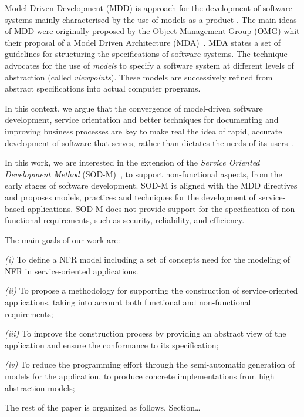 Model Driven Development (MDD) is approach for the development of software systems mainly characterised by the use of models as a product \cite{Selic03}.
The main ideas of MDD were originally proposed by the Object Management Group (OMG) whit their proposal of a Model Driven Architecture (MDA)~\cite{miller}. MDA states a set of guidelines for structuring the specifications of software systems. The technique advocates for the use of \textit{models} to specify a software system at different levels of abstraction (called \textit{viewpoints}).
These models are successively refined from abstract specifications into actual computer programs.

In this context, we argue that the convergence of model-driven software development, service orientation and better techniques for documenting and improving business processes are key to make real the idea of rapid, accurate development of software that serves, rather than dictates the needs of its users~\cite{watson}.

In this work, we are interested in the extension of the \textit{Service Oriented Development Method} (SOD-M)~\cite{decastro1}, to support non-functional aspects, from the early stages of software development.
SOD-M is aligned with the MDD directives and proposes models, practices and techniques for the development of service-based applications.
SOD-M does not provide support for the specification of non-functional requirements, such as
security, reliability, and efficiency.

The main goals of our work are:
\begin{trivlist}
\item \textit{(i)} To define a NFR model including a set of concepts need for the modeling of NFR in service-oriented applications.
\item \textit{(ii)} To propose a methodology for supporting the construction of service-oriented applications, taking into account both functional and non-functional requirements;
\item \textit{(iii)} To improve the construction process by providing an abstract view of the application and ensure the conformance to its specification;
\item \textit{(iv)} To reduce the programming effort through the semi-automatic generation of  models for the application, to produce concrete implementations from high abstraction models;
\end{trivlist}

The rest of the paper is organized as follows.
Section\dots





